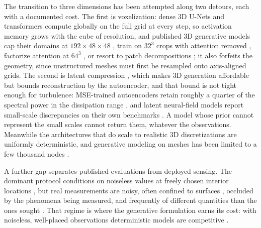 \documentclass{article} %
\begin{document}
The transition to three dimensions has been attempted along two detours, each with a documented cost. The first is voxelization: dense 3D U-Nets and transformers compute globally on the full grid at every step, so activation memory grows with the cube of resolution, and published 3D generative models cap their domains at $192\times48\times48$ \citep{lienen2024zero}, train on $32^3$ crops with attention removed \citep{oommen2026turbulent}, factorize attention at $64^3$ \citep{li2023factformer}, or resort to patch decompositions \citep{holzschuh2026pd3}; it also forfeits the geometry, since unstructured meshes must first be resampled onto axis-aligned grids. The second is latent compression \citep{du2024confild,zhou2025text2pde,wang2026fundiff,li2025latent}, which makes 3D generation affordable but bounds reconstruction by the autoencoder, and that bound is not tight enough for turbulence: MSE-trained autoencoders retain roughly a quarter of the spectral power in the dissipation range \citep{rafiq2026spectrally,glaws2020deep}, and latent neural-field models report small-scale discrepancies on their own benchmarks \citep{du2024confild}. A model whose prior cannot represent the small scales cannot return them, whatever the observations. Meanwhile the architectures that do scale to realistic 3D discretizations \citep{luo2025transolver,alkin2024upt,alkin2025abupt,li2023gino} are uniformly deterministic, and generative modeling on meshes has been limited to a few thousand nodes \citep{lino2025dgn}.

A further gap separates published evaluations from deployed sensing. The dominant protocol conditions on noiseless values at freely chosen interior locations \citep{shu2023physics,huang2024diffusionpde,amoros2026guiding}, but real measurements are noisy, often confined to surfaces \citep{guastoni2021convolutional,cuellar2024three,mousavi2025low}, occluded by the phenomena being measured, and frequently of different quantities than the ones sought \citep{barwey2021extracting,kildare2024deep}. That regime is where the generative formulation earns its cost: with noiseless, well-placed observations deterministic models are competitive \citep{zhuang2025spatially}.
\end{document}
